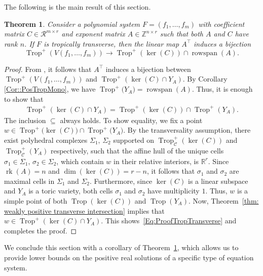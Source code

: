 \documentclass{article}
\newtheorem{theorem}{Theorem}[section]
\theoremstyle{definition}
\DeclareMathOperator{\rk}{rk}
\DeclareMathOperator{\Trop}{Trop}
\DeclareMathOperator{\rowspan}{rowspan}
\begin{document}
The following is the main result of this section.
\begin{theorem}
\label{thm: tropical equation solving}
Consider a polynomial system $F=(f_1, \dots , f_m)$ with coefficient matrix $C \in \mathcal{R}^{m\times r}$ and exponent matrix $A \in \mathbb{Z}^{n\times r}$ such that both $A$ and $C$ have rank $n$. If $F$ is tropically transverse, then the linear map $A^\top$ induces a bijection
    \[
    \Trop^+(V(f_1, \dots, f_m)) \longrightarrow \Trop^+(\ker(C)) \cap \operatorname{rowspan}(A).
    \]
\end{theorem}
\begin{proof}
From , it follows that $A^\top$ induces a bijection between $\Trop^+(V(f_1, \dots, f_m))$ and $\Trop^+(\ker(C) \cap Y_A)$. By Corollary \ref{Cor::PosTropMono}, we have $\Trop^+\big( 
 Y_A\big) = \rowspan(A)$. Thus, it is enough to show that
\begin{align}
\label{Eq:ProofTropTransverse}
\Trop^+(\ker(C) \cap Y_A) =  \Trop^+(\ker(C)) \cap \Trop^+(Y_A). 
\end{align}
The inclusion $\subseteq$ always holds. To show equality, we fix a point $w\in \Trop^+\big( \ker(C) \big) \cap \Trop^+\big( Y_A\big)$. By the transversality assumption, there exist polyhedral complexes $\Sigma_1, \, \Sigma_2$ supported on $\Trop_\mathcal{C}^+(\ker(C))$ and $\Trop_\mathcal{C}^+(Y_A)$ respectively, such that the affine hull of the unique cells $\sigma_1 \in \Sigma_1, \, \sigma_2 \in \Sigma_2$, which contain $w$ in their relative interiors, is $\mathbb{R}^r$. Since $\rk(A) = n$ and $\dim(\ker(C)) = r -n$, it follows that $\sigma_1$ and $\sigma_2$ are maximal cells in $\Sigma_1$ and $\Sigma_2$. Furthermore, since $\ker(C)$ is a linear subspace and $Y_A$ is a toric variety, both cells $\sigma_1$ and $\sigma_2$ have multiplicity $1$. Thus, $w$ is a simple point of both $\Trop(\ker(C))$ and $\Trop(Y_A)$.  Now, Theorem~\ref{thm: weakly positive transverse intersection} implies that $w \in \Trop^+(\ker(C) \cap Y_A)$. This shows~\eqref{Eq:ProofTropTransverse} and completes the proof.
\end{proof}

We conclude this section with a corollary of Theorem~\ref{thm: tropical equation solving}, which allows us to provide lower bounds on the positive real solutions of a specific type of equation system.
\end{document}

